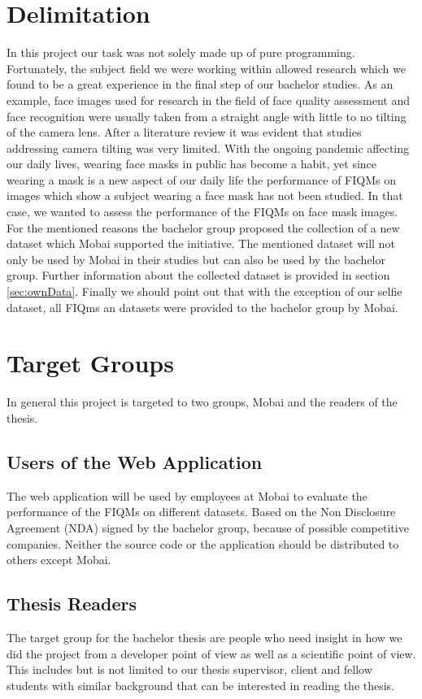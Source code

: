 \section{Delimitation}
\label{sec:delimit}
In this project our task was not solely made up of pure programming. Fortunately, the subject field we were working within allowed research which we found to be a great experience in the final step of our bachelor studies. As an example, face images used for research in the field of face quality assessment and face recognition were usually taken from a straight angle with little to no tilting of the camera lens. After a literature review it was evident that studies addressing camera tilting was very limited. With the ongoing pandemic affecting our daily lives, wearing face masks in public has become a habit, yet since wearing a mask is a new aspect of our daily life the performance of FIQMs on images which show a subject wearing a face mask has not been studied. In that case, we wanted to assess the performance of the FIQMs on face mask images. For the mentioned reasons the bachelor group proposed the collection of a new dataset which Mobai supported the initiative. The mentioned dataset will not only be used by Mobai in their studies but can also be used by the bachelor group. Further information about the collected dataset is provided in section \ref{sec:ownData}. Finally we should point out that with the exception of our selfie dataset, all FIQms an datasets were provided to the bachelor group by Mobai. 

\section{Target Groups}
\label{sec:TargetGroups}
In general this project is targeted to two groups, Mobai and the readers of the thesis. 

\subsection{Users of the Web Application}
The web application will be used by employees at Mobai to evaluate the performance of the FIQMs on different datasets. Based on the Non Disclosure Agreement (NDA) signed by the bachelor group, because of possible competitive companies. Neither the source code or the application should be distributed to others except Mobai.

\subsection{Thesis Readers}
The target group for the bachelor thesis are people who need insight in how we did the project from a developer point of view as well as a scientific point of view. This includes but is not limited to our thesis supervisor,  client and fellow students with similar background that can be interested in reading the thesis.

